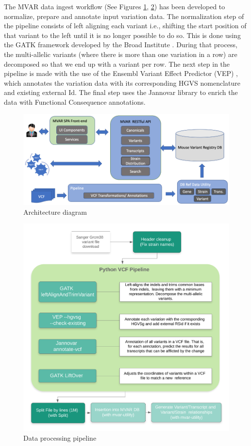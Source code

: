 \documentclass{article}
\begin{document}
The MVAR data ingest workflow (See Figures \ref{fig:arch_diagram}, \ref{fig:pipeline}) has been developed to normalize, prepare and annotate input variation data. The normalization step of the pipeline consists of left aligning each variant i.e., shifting the start position of that variant to the left until it is no longer possible to do so. This is done using the GATK framework developed by the Broad Institute \cite{mckenna10}. During that process, the multi-allelic variants (where there is more than one variation in a row) are decomposed so that we end up with a variant per row. The next step in the pipeline is made with the use of the Ensembl Variant Effect Predictor (VEP) \cite{mclaren15}, which annotates the variation data with its corresponding HGVS nomenclature and existing external Id. The final step uses the Jannovar library \cite{jäger14} to enrich the data with Functional Consequence annotations. 

\begin{figure}
\centering
\includegraphics[width=0.8\linewidth]{architecture_diagram.png}
\caption{\label{fig:arch_diagram}Architecture diagram}
\end{figure}

\begin{figure}
\centering
\includegraphics[width=0.8\linewidth]{pipeline.png}
\caption{\label{fig:pipeline}Data processing pipeline}
\end{figure}
\end{document}
